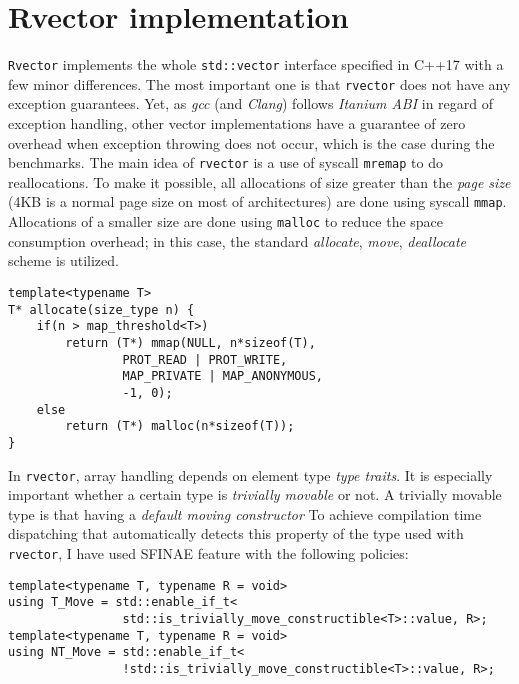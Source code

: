 \documentclass[inz, english, shortabstract]{iithesis}
\begin{document}
\chapter{Rvector implementation}

{\tt Rvector}\cite{rvector_impl} implements the whole {\tt std::vector} interface specified in C++17 with a few minor differences. The most important one is that {\tt rvector} does not have any exception guarantees. Yet, as \emph{gcc} (and \emph{Clang}) follows \emph{Itanium ABI}\cite{Itanium_ABI} in regard of exception handling, other vector implementations have a guarantee of zero overhead when exception throwing does not occur, which is the case during the benchmarks.
The main idea of {\tt rvector} is a use of syscall {\tt mremap} to do reallocations.
To make it possible, all allocations of size greater than the \emph{page size} (4KB is a normal page size on most of architectures) are done using syscall {\tt mmap}.
Allocations of a smaller size are done using {\tt malloc} to reduce the space consumption overhead; in this case, the standard \emph{allocate}, \emph{move}, \emph{deallocate} scheme is utilized.
\begin{lstlisting}[caption=rvector allocation.]
template<typename T>
T* allocate(size_type n) {
	if(n > map_threshold<T>)
    	return (T*) mmap(NULL, n*sizeof(T), 
                PROT_READ | PROT_WRITE,
                MAP_PRIVATE | MAP_ANONYMOUS,
                -1, 0);
    else
    	return (T*) malloc(n*sizeof(T));
}
\end{lstlisting}
In {\tt rvector}, array handling depends on element type \emph{type traits}.
It is especially important whether a certain type is \emph{trivially movable} or not. A trivially movable type is that having a \emph{default moving constructor}
To achieve compilation time dispatching that automatically detects this property of the type used with {\tt rvector}, I have used SFINAE feature with the following policies:
\begin{lstlisting}[caption=SFINAE policies.]
template<typename T, typename R = void>
using T_Move = std::enable_if_t<
				std::is_trivially_move_constructible<T>::value, R>;
template<typename T, typename R = void>
using NT_Move = std::enable_if_t<
				!std::is_trivially_move_constructible<T>::value, R>;
\end{lstlisting}
\end{document}
